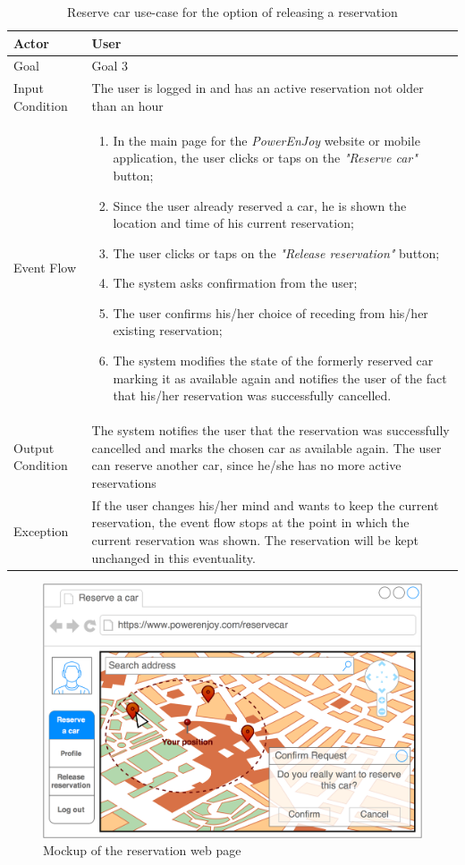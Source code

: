\begin{table}[H]
\begin{center}
\begin{tabular}{p{} | p{}}
\hline
Actor & User\\
\hline
Goal & Goal 3\\
\hline
Input Condition & The user is logged in and has an active reservation not older than an hour\\
\hline
Event Flow & 
\begin{enumerate}
\item In the main page for the \emph{PowerEnJoy} website or mobile application, the user clicks or taps on the \emph{"Reserve car"} button;
\item Since the user already reserved a car, he is shown the location and time of his current reservation;
\item The user clicks or taps on the \emph{"Release reservation"} button;
\item The system asks confirmation from the user;
\item The user confirms his/her choice of receding from his/her existing reservation;
\item The system modifies the state of the formerly reserved car marking it as available again and notifies the user of the fact that his/her reservation was successfully cancelled.
\end{enumerate} \\
\hline
Output Condition & The system notifies the user that the reservation was successfully cancelled and marks the chosen car as available again. The user can reserve another car, since he/she has no more active reservations\\
\hline
Exception & If the user changes his/her mind and wants to keep the current reservation, the event flow stops at the point in which the current reservation was shown. The reservation will be kept unchanged in this eventuality.\\
\hline
\end{tabular}
\end{center}
\caption{Reserve car use-case for the option of releasing a reservation}
\label{reserve_car_uc_alt}
\end{table}

\begin{figure}[H]
\begin{center}
		\includegraphics[width=\textwidth]{./specific_requirements/features/diagrams/web_reserve_car.png}
		\caption{Mockup of the reservation web page}
		\label{web_reserve_car}
\end{center}
\end{figure}